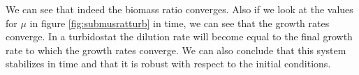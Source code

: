 \documentclass[12pt]{report}
\begin{document}
We can see that indeed the biomass ratio converges. Also if we look at the values for $\mu$ in figure \ref{fig:submusratturb} in time, we can see that the growth rates converge. In a turbidostat the dilution rate will become equal to the final growth rate to which the growth rates converge. We can also conclude that this system stabilizes in time and that it is robust with respect to the initial conditions. 





%
%



\begin{abstract}
  
\end{abstract}
\end{document}
